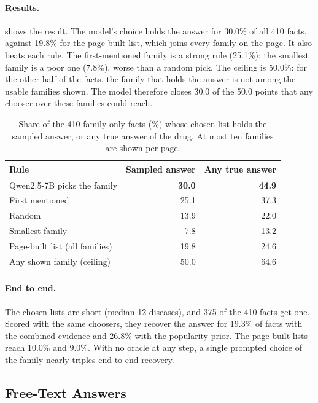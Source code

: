 \paragraph{Results.}
 shows the result. The model's choice holds the answer for 30.0\% of all 410 facts, against 19.8\% for the page-built list, which joins every family on the page. It also beats each rule. The first-mentioned family is a strong rule (25.1\%); the smallest family is a poor one (7.8\%), worse than a random pick. The ceiling is 50.0\%: for the other half of the facts, the family that holds the answer is not among the usable families shown. The model therefore closes 30.0 of the 50.0 points that any chooser over these families could reach.

\begin{table}[t]
\centering
\footnotesize
\setlength{\tabcolsep}{3pt}
\begin{tabular}{@{}lrr@{}}
\toprule
Rule & Sampled answer & Any true answer \\
\midrule
Qwen2.5-7B picks the family & \textbf{30.0} & \textbf{44.9} \\
First mentioned & 25.1 & 37.3 \\
Random & 13.9 & 22.0 \\
Smallest family & 7.8 & 13.2 \\
\midrule
Page-built list (all families) & 19.8 & 24.6 \\
Any shown family (ceiling) & 50.0 & 64.6 \\
\bottomrule
\end{tabular}
\caption{Share of the 410 family-only facts (\%) whose chosen list holds the sampled answer, or any true answer of the drug. At most ten families are shown per page.}
\label{tab:pick}
\end{table}

\paragraph{End to end.}
The chosen lists are short (median 12 diseases), and 375 of the 410 facts get one. Scored with the same choosers, they recover the answer for 19.3\% of facts with the combined evidence and 26.8\% with the popularity prior. The page-built lists reach 10.0\% and 9.0\%. With no oracle at any step, a single prompted choice of the family nearly triples end-to-end recovery.

\subsection{Free-Text Answers}

